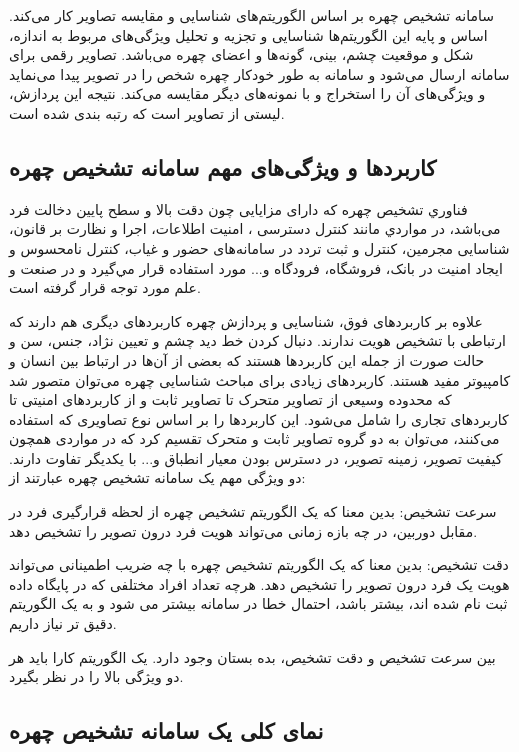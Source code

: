 سامانه تشخیص چهره بر اساس الگوریتم‌های شناسایی و مقایسه تصاویر کار می‌کند. اساس و پایه این الگوریتم‌ها شناسایی و تجزیه و تحلیل ویژگی‌های مربوط به اندازه، شکل و موقعیت چشم، بینی، گونه‌ها و 
اعضای چهره می‌باشد. تصاویر رقمی برای سامانه ارسال می‌شود و سامانه به طور خودکار چهره شخص را در تصویر پیدا می‌نماید و ویژگی‌های آن را استخراج و با نمونه‌های دیگر مقایسه می‌کند. نتیجه این پردازش، لیستی از تصاویر است که رتبه بندی شده است.


\subsection{کاربردها و ویژگی‌های مهم سامانه تشخیص چهره}

فناوري تشخیص چهره که دارای مزايايی چون دقت بالا و سطح پايين دخالت فرد می‌باشد، در مواردي مانند کنترل دسترسی ، امنيت اطلاعات، اجرا و نظارت بر قانون، شناسایی مجرمین، کنترل و ثبت تردد در سامانه‌های حضور و غیاب، کنترل نامحسوس و ایجاد امنیت در بانک، فروشگاه، فرودگاه و... مورد استفاده قرار مي‌گيرد و در صنعت و علم مورد توجه قرار گرفته است.

\noindent
علاوه بر کاربردهای فوق، شناسایی و پردازش چهره کاربردهای دیگری هم دارند که ارتباطی با تشخیص هویت ندارند. دنبال کردن خط دید چشم و تعیین نژاد، جنس، سن و حالت صورت از جمله این کاربردها هستند که بعضی از آن‌ها در ارتباط بین انسان و کامپیوتر مفید هستند. کاربردهای زیادی برای مباحث شناسایی چهره می‌توان متصور شد که محدوده وسیعی از تصاویر متحرک تا تصاویر ثابت و از کاربردهای امنیتی تا کاربردهای تجاری را شامل می‌شود. این کاربردها را بر اساس نوع تصاویری که استفاده می‌کنند، می‌توان به دو گروه تصاویر ثابت و متحرک تقسیم کرد که در مواردی همچون کیفیت تصویر، زمینه تصویر، در دسترس بودن معیار انطباق و... با یکدیگر تفاوت دارند. دو ویژگی مهم یک سامانه تشخیص چهره عبارتند از:

\noindent
سرعت تشخیص: بدین معنا که یک الگوریتم تشخیص چهره از لحظه قرارگیری فرد در مقابل دوربین، در چه بازه زمانی می‌تواند هویت فرد درون تصویر را تشخیص دهد.

\noindent
دقت تشخیص: بدین معنا که یک الگوریتم تشخیص چهره با چه ضریب اطمینانی می‌تواند هویت یک فرد درون تصویر را تشخیص دهد. هرچه تعداد افراد مختلفی که در پایگاه داده ثبت نام شده اند، بیشتر باشد، احتمال خطا در سامانه بیشتر می شود و به یک الگوریتم دقیق تر نیاز داریم.

\noindent
بین سرعت تشخیص و دقت تشخیص، بده بستان  وجود دارد. یک الگوریتم کارا باید هر دو ویژگی بالا را در نظر بگیرد.


\subsection{نمای کلی یک سامانه تشخیص چهره}

